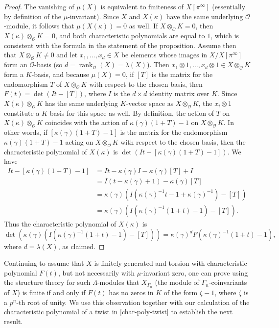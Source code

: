 \documentclass[12 pt]{amsart}
\theoremstyle{plain}
\theoremstyle{definition}
\numberwithin{equation}{section}
\numberwithin{table}{section}
\begin{document}
\begin{proof}
The vanishing of $\mu(X)$ is equivalent to finiteness of $X[\pi^\infty]$ (essentially by definition of the $\mu$-invariant). Since $X$ and $X(\kappa)$ have the same underlying $\mathscr{O}$-module, it follows that $\mu(X(\kappa))=0$ as well. If $X\otimes_\mathscr{O}K=0$, then $X(\kappa)\otimes_\mathscr{O} K=0$, and both characteristic polynomials are equal to $1$, which is consistent with the formula in the statement of the proposition. Assume then that $X\otimes_\mathscr{O}K\neq 0$ and let $x_1,\ldots,x_d\in X$ be elements whose images in $X/X[\pi^\infty]$ form an $\mathscr{O}$-basis (so $d=\operatorname{rank}_\mathscr{O}(X)=\lambda(X)$). Then $x_1\otimes 1,\ldots,x_d\otimes 1\in X\otimes_\mathscr{O}K$ form a $K$-basis, and because $\mu(X)=0$, if $[T]$ is the matrix for the endomorphism $T$ of $X\otimes_\mathscr{O}K$ with respect to the chosen basis, then $F(t)=\det(It-[T])$, where $I$ is the $d\times d$ identity matrix over $K$. Since $X(\kappa)\otimes_\mathscr{O}K$ has the same underlying $K$-vector space as $X\otimes_\mathscr{O}K$, the $x_i\otimes 1$ constitute a $K$-basis for this space as well. By definition, the action of $T$ on $X(\kappa)\otimes_\mathscr{O}K$ coincides with the action of $\kappa(\gamma)(1+T)-1$ on $X\otimes_\mathscr{O}K$. In other words, if $[\kappa(\gamma)(1+T)-1]$ is the matrix for the endomorphism $\kappa(\gamma)(1+T)-1$ acting on $X\otimes_\mathscr{O}K$ with respect to the chosen basis, then the characteristic polynomial of $X(\kappa)$ is $\det(It-[\kappa(\gamma)(1+T)-1])$. We have
\begin{align*}
It-[\kappa(\gamma)(1+T)-1]&=It-\kappa(\gamma)I-\kappa(\gamma)[T]+I\\
&=I(t-\kappa(\gamma)+1)-\kappa(\gamma)[T]\\
&=\kappa(\gamma)(I(\kappa(\gamma)^{-1}t-1+\kappa(\gamma)^{-1})-[T])\\
&=\kappa(\gamma)(I(\kappa(\gamma)^{-1}(1+t)-1)-[T])\text{.}
\end{align*}
Thus the characteristic polynomial of $X(\kappa)$ is 
\begin{equation*}
\det(\kappa(\gamma)(I(\kappa(\gamma)^{-1}(1+t)-1)-[T]))=\kappa(\gamma)^dF(\kappa(\gamma)^{-1}(1+t)-1)\text{,}
\end{equation*} 
where $d=\lambda(X)$, as claimed.
\end{proof}
\indent Continuing to assume that $X$ is finitely generated and torsion with characteristic polynomial $F(t)$, but not necessarily with $\mu$-invariant zero, one can prove using the structure theory for such $\Lambda$-modules that $X_{\Gamma_n}$ (the module of $\Gamma_n$-coinvariants of $X$) is finite if and only if $F(t)$ has no zeros in $\overline{K}$ of the form $\zeta-1$, where $\zeta$ is a $p^n$-th root of unity. We use this observation together with our calculation of the characteristic polynomial of a twist in \cref{char-poly-twist} to establish the next result.
\end{document}
